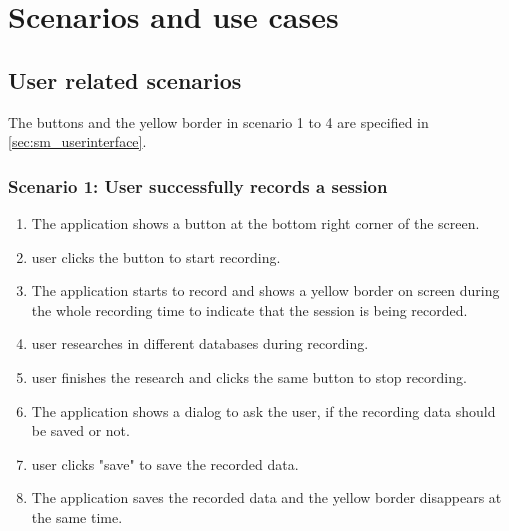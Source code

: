 \chapter{Scenarios and use cases}
\label{ch:scenarios}

\section{User related scenarios}
\newcommand{\see}[1][reference missing]{(see \specref{#1})}
The buttons and the yellow border in scenario 1 to 4 are specified in \ref{sec:sm_userinterface}.

\subsection{Scenario 1: User successfully records a session}
\begin{enumerate}
    \item The application shows a button at the bottom right corner of the screen.
    \item \Gls{user} clicks the button to start recording.
    \item The application starts to record and shows a yellow border on screen during the whole recording time to indicate that the \gls{session} is being recorded.
    \item \Gls{user} researches in different databases during recording.
    \item \Gls{user} finishes the research and clicks the same button to stop recording.
    \item The application shows a dialog to ask the \gls{user}, if the recording data should be saved or not.
    \item \Gls{user} clicks "save" to save the recorded data.
    \item The application saves the recorded data and the yellow border disappears at the same time.
\end{enumerate}

